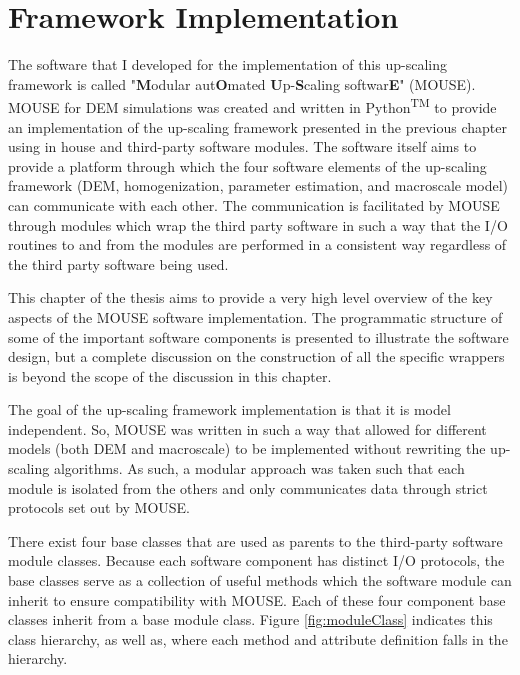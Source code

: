 \chapter{Framework Implementation}

The software that I developed for the implementation of this up-scaling framework is called "\textbf{M}odular aut\textbf{O}mated \textbf{U}p-\textbf{S}caling softwar\textbf{E}" (MOUSE). MOUSE for DEM simulations was created and written in Python\textsuperscript{TM} to provide an implementation of the up-scaling framework presented in the previous chapter using in house and third-party software modules. The software itself aims to provide a platform through which the four software elements of the up-scaling framework (DEM, homogenization, parameter estimation, and macroscale model) can communicate with each other. The communication is facilitated by MOUSE through modules which wrap the third party software in such a way that the I/O routines to and from the modules are performed in a consistent way regardless of the third party software being used. 

This chapter of the thesis aims to provide a very high level overview of the key aspects of the MOUSE software implementation. The programmatic structure of some of the important software components is presented to illustrate the software design, but a complete discussion on the construction of all the specific wrappers is beyond the scope of the discussion in this chapter.

The goal of the up-scaling framework implementation is that it is model independent. So, MOUSE was written in such a way that allowed for different models (both DEM and macroscale) to be implemented without rewriting the up-scaling algorithms. As such, a modular approach was taken such that each module is isolated from the others and only communicates data through strict protocols set out by MOUSE.

There exist four base classes that are used as parents to the third-party software module classes. Because each software component has distinct I/O protocols, the base classes serve as a collection of useful methods which the software module can inherit to ensure compatibility with MOUSE. Each of these four component base classes inherit from a base module class. Figure \ref{fig:moduleClass} indicates this class hierarchy, as well as, where each method and attribute definition falls in the hierarchy.


